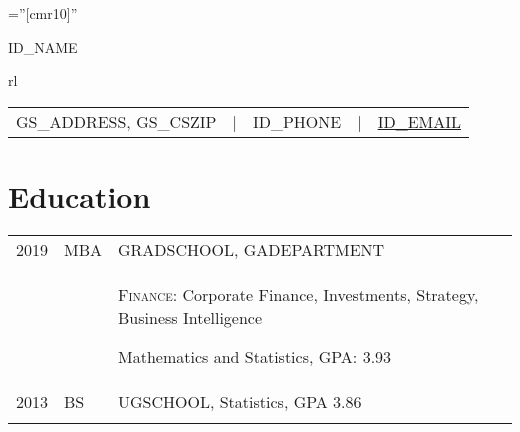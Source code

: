\documentclass[a4paper,10pt]{article}
\begin{document}

\sloppy






\font\fb=''[cmr10]'' %

\par{\centering
		{\Huge  \textsc{ID_NAME}}
		\smallskip \par
		\begin{tabular}{rl}
		\small
		\begin{tabular}{rllll}
			GS_ADDRESS, GS_CSZIP 	&
			| & ID_PHONE			&
    		| & \href{mailto:ID_EMAIL}{ID_EMAIL}	\\
		\end{tabular}
		\end{tabular}
		\bigskip
		\par}






\smallskip
\section{Education}
\begin{supertabular}{p{2cm} p{1.0cm} p{13.9cm}}
	\textsc{2019}		&		\textsc{MBA} & \textsc{GRADSCHOOL}, \small GADEPARTMENT \\
					&&		 \begin{enumerate*}[label =$\diamond$, itemjoin={\newline}]
							 \item \footnotesize  \textsc{Finance:} Corporate Finance, Investments, Strategy, Business Intelligence
							 \item \footnotesize Mathematics and Statistics, GPA: 3.93
							 \end{enumerate*}  \\
	\textsc{2013} 	& 	\textsc{BS} & \textsc{UGSCHOOL}, \small Statistics, GPA 3.86 \\
	 \\
\end{supertabular}


\smallskip
\end{document}
